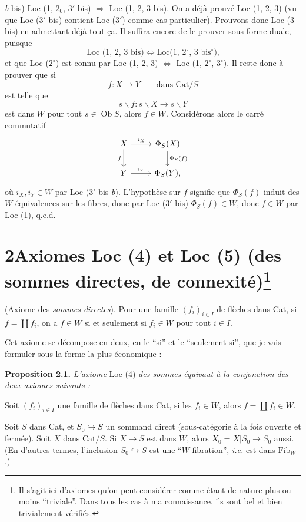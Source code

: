\documentclass[11pt]{article}
\newcommand{\printedpage}[1]{\marginpar{\footnotesize p.~#1}}
\newcommand{\msp}[1]{\marginpar{\footnotesize [#1]}}
\begin{document}
\textit{b} bis) Loc (1, $2_0$, $3'$ bis) $\Longrightarrow$ Loc (1, 2, 3 bis). On a déjà prouvé Loc (1, 2, 3) (vu que Loc ($3'$ bis) contient Loc ($3'$) comme cas particulier). Prouvons donc Loc (3 bis) en admettant déjà tout ça. Il suffira encore de le prouver sous forme duale, puisque
\[
\text{Loc (1, 2, 3 bis)} \iff \text{Loc(1, $2^\circ$, 3 bis$^\circ$),}
\]
\msp{page 8}et que Loc ($2^\circ$) est connu par Loc (1, 2, 3) $\Longleftrightarrow$ Loc (1, $2^\circ$, $3^\circ$). Il reste donc à prouver que si
\[
f : X \longrightarrow Y \qquad \text{dans } \mathrm{Cat}/S
\]
est telle que
\[
s\backslash f : s\backslash X \longrightarrow s\backslash Y
\]
est dans $W$ pour tout $s \in \operatorname{Ob} S$, alors $f \in W$. Considérons alors le carré commutatif
\[
\begin{tikzcd}
X \arrow[r, "i_X"] \arrow[d, "f"'] & \Phi_S(X) \arrow[d, "\Phi_S(f)"] \\
Y \arrow[r, "i_Y"] & \Phi_S(Y),
\end{tikzcd}
\]
où $i_X, i_Y \in W$ par Loc ($3'$ bis \textit{b}). L'hypothèse sur $f$ signifie que $\Phi_S(f)$ induit des $W$-équivalences sur les fibres, donc par Loc ($3'$ bis) $\Phi_S(f) \in W$, donc $f \in W$ par Loc (1), q.e.d.

\printedpage{5}
\section*{2\quad Axiomes Loc (4) et Loc (5) (des sommes directes, de connexité)\protect\footnote{Il s'agit ici d'axiomes qu'on peut considérer comme étant de nature plus ou moins “triviale”. Dans tous les cas à ma connaissance, ils sont bel et bien trivialement vérifiés.}}

\begin{description}[leftmargin=7em, labelwidth=6em]
\item[Loc (4)] (Axiome des \textit{sommes directes}). Pour une famille $(f_i)_{i\in I}$ de flèches dans Cat, si $f = \coprod f_i$, on a $f \in W$ si et seulement si $f_i \in W$ pour tout $i \in I$.
\end{description}

Cet axiome se décompose en deux, en le “si” et le “seulement si”, que je vais formuler sous la forme la plus économique :

\textbf{Proposition 2.1.} \textit{L'axiome} Loc (4) \textit{des sommes équivaut à la conjonction des deux axiomes suivants :}

\begin{description}[leftmargin=7em, labelwidth=6em]
\item[Loc (4 a)] \msp{page 9}Soit $(f_i)_{i\in I}$ une famille de flèches dans Cat, si les $f_i \in W$, alors $f = \coprod f_i \in W$.
\item[Loc (4 b)] Soit $S$ dans Cat, et $S_0 \hookrightarrow S$ un sommand direct (sous-catégorie à la fois ouverte et fermée). Soit $X$ dans Cat$/S$. Si $X \longrightarrow S$ est dans $W$, alors $X_0 = X|S_0 \longrightarrow S_0$ aussi. (En d'autres termes, l'inclusion $S_0 \hookrightarrow S$ est une “$W$-fibration”, \textit{i.e.} est dans $\mathrm{Fib}_W$.)
\end{description}
\end{document}
